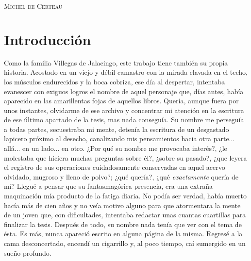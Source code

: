 \documentclass[14pt,twoside,final]{extbook} %
\begin{document}
\begin{flushright}
\textsc{Michel de Certeau}
\end{flushright}
\chapter*{Introducción}
\label{ch:introduccion}
\pagestyle{empty}
\thispagestyle{empty}
\pagestyle{fancy}
\fancyhf{} %
\fancyhead[LE,RO]{\thepage}
\renewcommand{\headrulewidth}{0pt}
Como la familia Villegas de Jalacingo, este trabajo tiene también su propia historia. Acostado en un viejo y débil camastro con la mirada clavada en el techo, los músculos endurecidos y la boca cobriza, ese día al despertar, intentaba evanescer con exiguos logros el nombre de aquel personaje que, días antes, había aparecido en las amarillentas fojas de aquellos libros. Quería, aunque fuera por unos instantes, olvidarme de ese archivo y concentrar mi atención en la escritura de ese último apartado de la tesis, mas nada conseguía. Su nombre me perseguía a todas partes, secuestraba mi mente, detenía la escritura de un desgastado lapicero próximo al desecho, canalizando mis pensamientos hacia otra parte... allá... en un lado... en otro. ¿Por qué su nombre me provocaba interés?, ¿le molestaba que hiciera muchas preguntas sobre él?, ¿sobre su pasado?, ¿que leyera el registro de sus operaciones cuidadosamente conservadas en aquel acervo olvidado, mugroso y lleno de polvo?; ¿qué quería?, ¿qué \emph{exactamente} quería de mí? Llegué a pensar que su fantasmagórica presencia, era una extraña maquinación mía producto de la fatiga diaria. No podía ser verdad, había muerto hacía más de cien años y no veía motivo alguno para que atormentara la mente de un joven que, con dificultades, intentaba redactar unas cuantas cuartillas para finalizar la tesis. Después de todo, su nombre nada tenía que ver con el tema de ésta. Es más, nunca apareció escrito en alguna página de la misma. Regresé a la cama desconcertado, encendí un cigarrillo y, al poco tiempo, caí sumergido en un sueño profundo.
\end{document}
